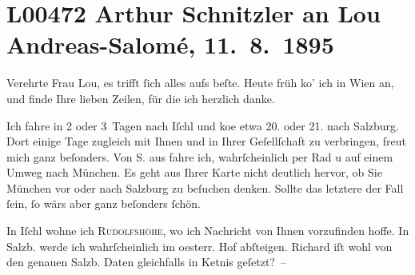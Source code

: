 

\section[Arthur Schnitzler an Lou Andreas-Salomé, 11. 8. 1895]{L00472 Arthur Schnitzler an Lou Andreas-Salomé, 11. 8. 1895}
\nopagebreak{}
\rehead{ }\normalsize\beginnumbering{}
\toendnotes[C]{\smallbreak\pagebreak[2]}
\toendnotes[C]{\smallbreak}
\pstart{}{\pb}Verehrte Frau Lou,\pend\vspace{0.5em}
\pstart
           es trifft{ }ſich alles aufs beſte. Heute früh ko{\geminationm}’ ich in
                  Wien an, und  finde Ihre lieben Zeilen, für die ich herzlich danke.\pend
           
\pstart
           Ich fahre in 2 oder 3 Tagen nach Iſchl und ko{\geminationm}e etwa 20. oder 21. nach Salzburg. Dort einige Tage zugleich mit Ihnen und
               in Ihrer Geſellſchaft zu verbringen, freut {\pb}mich ganz beſonders. Von S. aus fahre ich, wahrſcheinlich per Rad u auf
               einem Umweg nach München. Es geht aus Ihrer
               Karte nicht deutlich hervor, ob Sie München vor
               oder nach Salzburg zu beſuchen denken. Sollte das
               letztere der Fall{ }ſein,{ }ſo wärs aber ganz beſonders{ }ſchön.\pend
           
\pstart
           In Iſchl wohne ich \textsc{Rudolfshöhe}, {\pb}wo ich Nachricht von Ihnen vorzufinden hoffe. In Salzb. werde ich wahrſcheinlich im oesterr. Hof abſteigen. Richard iſt wohl von den genauen Salzb.
               Daten gleichfalls in Ke{\geminationn}tnis geſetzt? –\pend
           
